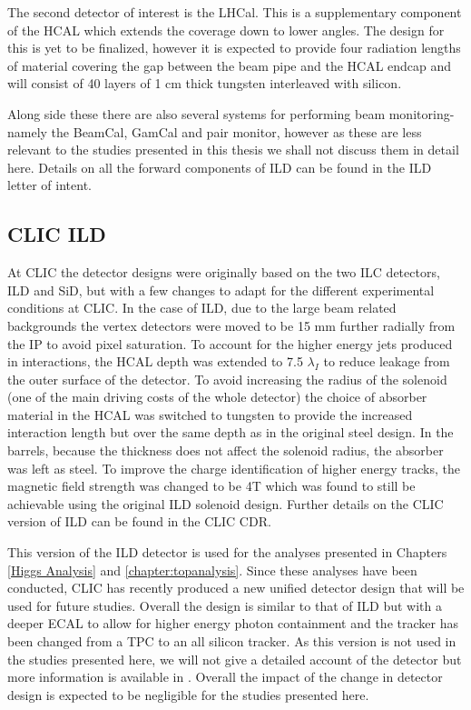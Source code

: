 The second detector of interest is the LHCal. This is a supplementary component of the \ac{HCAL} which extends the coverage down to lower angles. The design for this is yet to be finalized, however it is expected to provide four radiation lengths of material covering the gap between the beam pipe and the \ac{HCAL} endcap and will consist of 40 layers of 1 cm thick tungsten interleaved with silicon.

Along side these there are also several systems for performing beam monitoring- namely the BeamCal, GamCal and pair monitor, however as these are less relevant to the studies presented in this thesis we shall not discuss them in detail here. Details on all the forward components of \ac{ILD} can be found in the \ac{ILD} letter of intent\cite{ILD}.


\subsection{CLIC ILD}

At \ac{CLIC} the detector designs were originally based on the two \ac{ILC} detectors, \ac{ILD} and \ac{SiD}, but with a few changes to adapt for the different experimental conditions at \ac{CLIC}. In the case of \ac{ILD}, due to the large beam related backgrounds the vertex detectors were moved to be 15 mm further radially from the \ac{IP} to avoid pixel saturation. To account for the higher energy jets produced in interactions, the \ac{HCAL} depth was extended to 7.5 $\lambda_I$ to reduce leakage from the outer surface of the detector. To avoid increasing the radius of the solenoid (one of the main driving costs of the whole detector) the choice of absorber material in the \ac{HCAL} was switched to tungsten to provide the increased interaction length but over the same depth as in the original steel design. In the barrels, because the thickness does not affect the solenoid radius, the absorber was left as steel. To improve the charge identification of higher energy tracks, the magnetic field strength was changed to be 4T which was found to still be achievable using the original \ac{ILD} solenoid design. Further details on the CLIC version of \ac{ILD} can be found in the \ac{CLIC} \ac{CDR}\cite{CDR}.

This version of the \ac{ILD} detector is used for the analyses presented in Chapters \ref{Higgs Analysis} and \ref{chapter:topanalysis}. Since these analyses have been conducted, \ac{CLIC} has recently produced a new unified detector design that will be used for future studies. Overall the design is similar to that of \ac{ILD} but with a deeper \ac{ECAL} to allow for higher energy photon containment and the tracker has been changed from a \ac{TPC} to an all silicon tracker. As this version is not used in the studies presented here, we will not give a detailed account of the detector but more information is available in \cite{Pitters:2018jxt}. Overall the impact of the change in detector design is expected to be negligible for the studies presented here.






